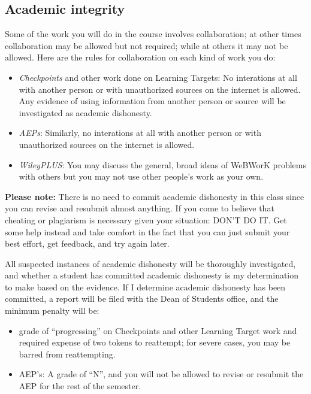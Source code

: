 \hypertarget{academic-integrity}{%
\subsection{Academic integrity}\label{academic-integrity}}

Some of the work you will do in the course involves collaboration; at
other times collaboration may be allowed but not required; while at
others it may not be allowed. Here are the rules for collaboration on
each kind of work you do:

\begin{itemize}
\tightlist
\item
  \emph{Checkpoints} and other work done on Learning Targets: No
  interations at all with another person or with unauthorized sources on
  the internet is allowed. Any evidence of using information from
  another person or source will be investigated as academic dishonesty.
\item
  \emph{AEPs}: Similarly, no interations at all with another person or
  with unauthorized sources on the internet is allowed.
\item
  \emph{WileyPLUS}: You may discuss the general, broad ideas of WeBWorK
  problems with others but you may not use other people's work as your
  own.
\end{itemize}

\textbf{Please note:} There is no need to commit academic dishonesty in
this class since you can revise and resubmit almost anything. If you
come to believe that cheating or plagiarism is necessary given your
situation: DON'T DO IT. Get some help instead and take comfort in the
fact that you can just submit your best effort, get feedback, and try
again later.

All suspected instances of academic dishonesty will be thoroughly
investigated, and whether a student has committed academic dishonesty is
my determination to make based on the evidence. If I determine academic
dishonesty has been committed, a report will be filed with the Dean of
Students office, and the minimum penalty will be:

\begin{itemize}
\tightlist
\item
  grade of ``progressing'' on Checkpoints and other Learning Target work
  and required expense of two tokens to reattempt; for severe cases, you
  may be barred from reattempting.
\item
  AEP's: A grade of ``N'', and you will not be allowed to revise or
  resubmit the AEP for the rest of the semester.
\end{itemize}

